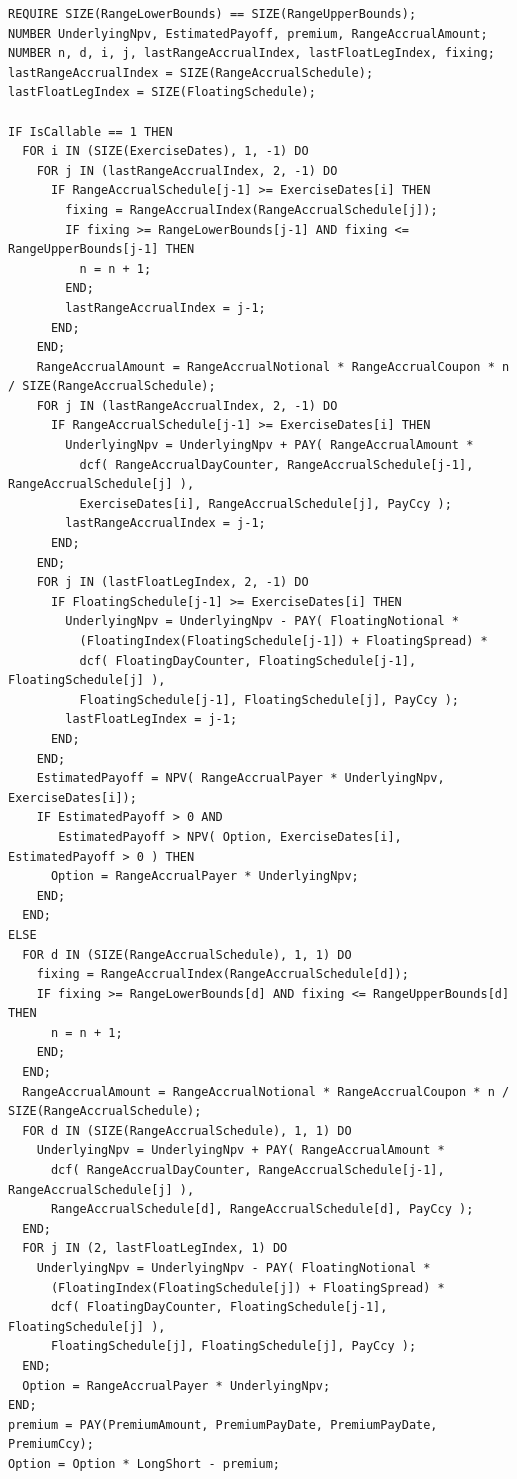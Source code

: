 \begin{listing}[hbt]
\begin{verbatim}
REQUIRE SIZE(RangeLowerBounds) == SIZE(RangeUpperBounds);
NUMBER UnderlyingNpv, EstimatedPayoff, premium, RangeAccrualAmount;
NUMBER n, d, i, j, lastRangeAccrualIndex, lastFloatLegIndex, fixing;
lastRangeAccrualIndex = SIZE(RangeAccrualSchedule);
lastFloatLegIndex = SIZE(FloatingSchedule);

IF IsCallable == 1 THEN
  FOR i IN (SIZE(ExerciseDates), 1, -1) DO
    FOR j IN (lastRangeAccrualIndex, 2, -1) DO
      IF RangeAccrualSchedule[j-1] >= ExerciseDates[i] THEN
        fixing = RangeAccrualIndex(RangeAccrualSchedule[j]);
        IF fixing >= RangeLowerBounds[j-1] AND fixing <= RangeUpperBounds[j-1] THEN
          n = n + 1;
        END;
        lastRangeAccrualIndex = j-1;
      END;
    END;
    RangeAccrualAmount = RangeAccrualNotional * RangeAccrualCoupon * n / SIZE(RangeAccrualSchedule);
    FOR j IN (lastRangeAccrualIndex, 2, -1) DO
      IF RangeAccrualSchedule[j-1] >= ExerciseDates[i] THEN
        UnderlyingNpv = UnderlyingNpv + PAY( RangeAccrualAmount *
          dcf( RangeAccrualDayCounter, RangeAccrualSchedule[j-1], RangeAccrualSchedule[j] ),
          ExerciseDates[i], RangeAccrualSchedule[j], PayCcy );
        lastRangeAccrualIndex = j-1;
      END;
    END;
    FOR j IN (lastFloatLegIndex, 2, -1) DO
      IF FloatingSchedule[j-1] >= ExerciseDates[i] THEN
        UnderlyingNpv = UnderlyingNpv - PAY( FloatingNotional *
          (FloatingIndex(FloatingSchedule[j-1]) + FloatingSpread) *
          dcf( FloatingDayCounter, FloatingSchedule[j-1], FloatingSchedule[j] ),
          FloatingSchedule[j-1], FloatingSchedule[j], PayCcy );
        lastFloatLegIndex = j-1;
      END;
    END;
    EstimatedPayoff = NPV( RangeAccrualPayer * UnderlyingNpv, ExerciseDates[i]);
    IF EstimatedPayoff > 0 AND
       EstimatedPayoff > NPV( Option, ExerciseDates[i], EstimatedPayoff > 0 ) THEN
      Option = RangeAccrualPayer * UnderlyingNpv;
    END;
  END;
ELSE
  FOR d IN (SIZE(RangeAccrualSchedule), 1, 1) DO
    fixing = RangeAccrualIndex(RangeAccrualSchedule[d]);
    IF fixing >= RangeLowerBounds[d] AND fixing <= RangeUpperBounds[d] THEN
      n = n + 1;
    END;
  END;
  RangeAccrualAmount = RangeAccrualNotional * RangeAccrualCoupon * n / SIZE(RangeAccrualSchedule);
  FOR d IN (SIZE(RangeAccrualSchedule), 1, 1) DO
    UnderlyingNpv = UnderlyingNpv + PAY( RangeAccrualAmount *
      dcf( RangeAccrualDayCounter, RangeAccrualSchedule[j-1], RangeAccrualSchedule[j] ),
      RangeAccrualSchedule[d], RangeAccrualSchedule[d], PayCcy );
  END;
  FOR j IN (2, lastFloatLegIndex, 1) DO
    UnderlyingNpv = UnderlyingNpv - PAY( FloatingNotional *
      (FloatingIndex(FloatingSchedule[j]) + FloatingSpread) *
      dcf( FloatingDayCounter, FloatingSchedule[j-1], FloatingSchedule[j] ),
      FloatingSchedule[j], FloatingSchedule[j], PayCcy );
  END;
  Option = RangeAccrualPayer * UnderlyingNpv;
END;
premium = PAY(PremiumAmount, PremiumPayDate, PremiumPayDate, PremiumCcy);
Option = Option * LongShort - premium;
\end{verbatim}
\caption{Payoff script for a Callable Range Accrual.}
\label{lst:callable_range_accrual}
\end{listing}

